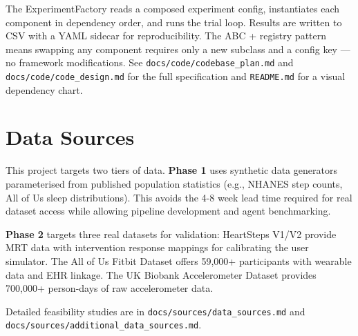 \documentclass[11pt,a4paper]{article}
\begin{document}
The ExperimentFactory reads a composed experiment config, instantiates
each component in dependency order, and runs the trial loop. Results are
written to CSV with a YAML sidecar for reproducibility. The ABC + registry
pattern means swapping any component requires only a new subclass and a
config key --- no framework modifications. See
\texttt{docs/code/codebase\_plan.md} and \texttt{docs/code/code\_design.md}
for the full specification and \texttt{README.md} for a visual dependency
chart.

\section{Data Sources}
\label{sec:data}

This project targets two tiers of data. \textbf{Phase 1} uses synthetic data
generators parameterised from published population statistics (e.g., NHANES
step counts, All of Us sleep distributions). This avoids the 4-8 week lead
time required for real dataset access while allowing pipeline development and
agent benchmarking.

\textbf{Phase 2} targets three real datasets for validation:
HeartSteps V1/V2 \cite{klasnja2019heartsteps,klasnja2022heartsteps}
provide MRT data with intervention response mappings for calibrating the
user simulator. The All of Us Fitbit Dataset \cite{patten2026allofus}
offers 59,000+ participants with wearable data and EHR linkage. The UK
Biobank Accelerometer Dataset \cite{williamson2024ukbiobank} provides
700,000+ person-days of raw accelerometer data.

Detailed feasibility studies are in \texttt{docs/sources/data\_sources.md}
and \texttt{docs/sources/additional\_data\_sources.md}.
\end{document}
